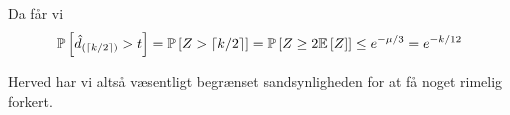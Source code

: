 Da får vi
\begin{align}
  \P{\hat d_{(\ceil{k/2})} > t}
  = \P{Z > \ceil{k/2}}
  = \P{Z \geq 2 \E{Z}}
  \leq e^{- \mu / 3}
  = e^{- k / 12}
\end{align}

Herved har vi altså væsentligt begrænset sandsynligheden for at få noget rimelig forkert.










